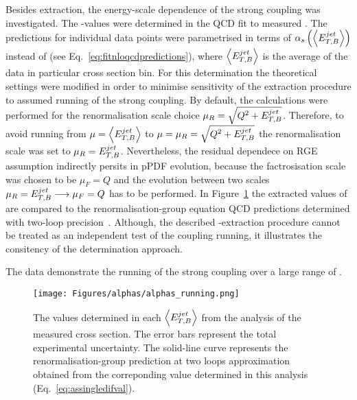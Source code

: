 Besides \asz extraction, the energy-scale dependence of the strong coupling was investigated. The \as-values were determined in the QCD fit to measured \dsdetjetb. The predictions for individual \dsdetjetb data points were parametrised in terms of $\mbox{$\alpha_{s}$}\left(\left<\mbox{$E_{T,B}^{jet}$}\right>\right)$ instead of \asz (see Eq.~\eqref{eq:fitnloqcdpredictions}), where $\left<\mbox{$E_{T,B}^{jet}$}\right>$ is the average \etjetb of the data in particular cross section bin. For this determination the theoretical settings were modified in order to minimise sensitivity of the extraction procedure to assumed running of the strong coupling. By default, the calculations were performed for the renormalisation scale choice $\mu_R=\sqrt{\mbox{${Q^2}$}+\mbox{$E_{T,B}^{jet}$}}$. Therefore, to avoid running from $\mu=\left<\mbox{$E_{T,B}^{jet}$}\right>$ to $\mu=\mu_R=\sqrt{\mbox{${Q^2}$}+\mbox{$E_{T,B}^{jet}$}}$ the renormalisation scale was set to $\mu_R=\mbox{$E_{T,B}^{jet}$}$. Nevertheless, the residual dependece on RGE assumption indirectly persits in pPDF evolution, because the factrosisation scale was chosen to be $\mu_F=Q$ and the evolution between two scales $\mu_R = \mbox{$E_{T,B}^{jet}$} \longrightarrow \mu_F = Q$ has to be performed. In Figure~\ref{fig:asrunning} the extracted values of \as are compared to the renormalisation-group equation QCD predictions determined with two-loop precision~\cite{Gross:1973id, Politzer:1973fx, Gross:1973ju, Politzer:1974fr}. Although, the described \as-extraction procedure cannot be treated as an independent test of the coupling running, it illustrates the consitency of the \as determination approach.

The data demonstrate the running of the strong coupling over a large range of \etjetb.

\begin{figure}[t]
 \centering
 \texttt{[image: Figures/alphas/alphas\_running.png]}
 \caption{The \as values determined in each $\left<\mbox{$E_{T,B}^{jet}$}\right>$ from the analysis of the measured \dsdetjetb cross section. The error bars represent the total experimental uncertainty. The solid-line curve represents the renormalisation-group prediction at two loops approximation obtained from the correponding \asz value determined in this analysis (Eq.~\eqref{eq:assingledifval}).}
 \label{fig:asrunning}
\end{figure}



